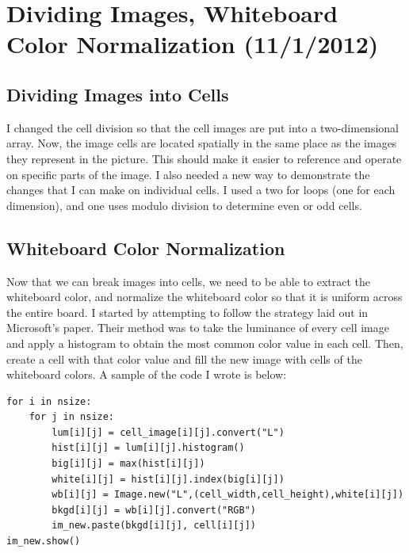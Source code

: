 \documentclass[]{article}
\begin{document}
	\section{Dividing Images, Whiteboard Color Normalization (11/1/2012)}
	\subsection*{Dividing Images into Cells}
		I changed the cell division so that the cell images are put into a two-dimensional array.  Now, the image cells are located spatially in the same place as the images they represent in the picture.  This should make it easier to reference and operate on specific parts of the image.  I also needed a new way to demonstrate the changes that I can make on individual cells.  I used a two for loops (one for each dimension), and one uses modulo division to determine even or odd cells.
		
		\subsection*{Whiteboard Color Normalization}
		Now that we can break images into cells, we need to be able to extract the whiteboard color, and normalize the whiteboard color so that it is uniform across the entire board.  I started by attempting to follow the strategy laid out in Microsoft's paper.  Their method was to take the luminance of every cell image and apply a histogram to obtain the most common color value in each cell.  Then, create a cell with that color value and fill the new image with cells of the whiteboard colors.  A sample of the code I wrote is below:

\begin{verbatim}
for i in nsize:
    for j in nsize:
        lum[i][j] = cell_image[i][j].convert("L")
        hist[i][j] = lum[i][j].histogram()
        big[i][j] = max(hist[i][j])
        white[i][j] = hist[i][j].index(big[i][j])
        wb[i][j] = Image.new("L",(cell_width,cell_height),white[i][j])
        bkgd[i][j] = wb[i][j].convert("RGB")
        im_new.paste(bkgd[i][j], cell[i][j])
im_new.show()
\end{verbatim}
\end{document}

